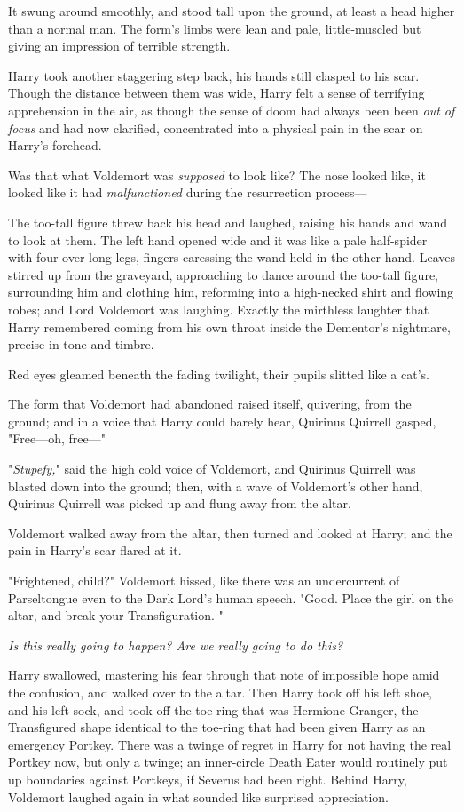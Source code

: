 It swung around smoothly, and stood tall upon the ground, at least a head
higher than a normal man. The form's limbs were lean and pale, little-muscled
but giving an impression of terrible strength.

Harry took another staggering step back, his hands still clasped to his scar.
Though the distance between them was wide, Harry felt a sense of terrifying
apprehension in the air, as though the sense of doom had always been been
\emph{out of focus} and had now clarified, concentrated into a physical pain in
the scar on Harry's forehead.

Was that what Voldemort was \emph{supposed} to look like? The nose looked like,
it looked like it had \emph{malfunctioned} during the resurrection process---

The too-tall figure threw back his head and laughed, raising his hands and wand
to look at them. The left hand opened wide and it was like a pale half-spider
with four over-long legs, fingers caressing the wand held in the other hand.
Leaves stirred up from the graveyard, approaching to dance around the too-tall
figure, surrounding him and clothing him, reforming into a high-necked shirt
and flowing robes; and Lord Voldemort was laughing. Exactly the mirthless
laughter that Harry remembered coming from his own throat inside the Dementor's
nightmare, precise in tone and timbre.

Red eyes gleamed beneath the fading twilight, their pupils slitted like a cat's.

The form that Voldemort had abandoned raised itself, quivering, from the
ground; and in a voice that Harry could barely hear, Quirinus Quirrell gasped,
"Free---oh, free---"

"\emph{Stupefy,}" said the high cold voice of Voldemort, and Quirinus Quirrell
was blasted down into the ground; then, with a wave of Voldemort's other hand,
Quirinus Quirrell was picked up and flung away from the altar.

Voldemort walked away from the altar, then turned and looked at Harry; and the
pain in Harry's scar flared at it.

"Frightened, child?" Voldemort hissed, like there was an undercurrent of
Parseltongue even to the Dark Lord's human speech. "Good. Place the girl on the
altar, and break your Transfiguration. "

\emph{Is this really going to happen? Are we really going to do this?}

Harry swallowed, mastering his fear through that note of impossible hope amid
the confusion, and walked over to the altar. Then Harry took off his left shoe,
and his left sock, and took off the toe-ring that was Hermione Granger, the
Transfigured shape identical to the toe-ring that had been given Harry as an
emergency Portkey. There was a twinge of regret in Harry for not having the
real Portkey now, but only a twinge; an inner-circle Death Eater would
routinely put up boundaries against Portkeys, if Severus had been right. Behind
Harry, Voldemort laughed again in what sounded like surprised appreciation.


